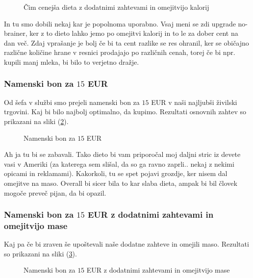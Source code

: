 \documentclass[a4paper]{article}
\begin{document}
\begin{figure}[H]
    \centering
    \caption{Čim cenejša dieta z dodatnimi zahtevami in omejitvijo kalorij}
    \label{fig:eur-add-cal}
\end{figure}

In tu smo dobili nekaj kar je popolnoma uporabno. Vsaj meni se zdi upgrade no-brainer, ker 
z to dieto lahko jemo po omejitvi kalorij in to le za dober cent na dan več. Zdaj vprašanje je bolj 
če bi ta cent razlike se res ohranil, ker se običajno različne količine hrane v resnici
prodajajo po različnih cenah, torej če bi npr. kupili manj mleka, bi bilo to verjetno dražje. 

\subsubsection{Namenski bon za $15$ EUR}
Od šefa v službi smo prejeli namenski bon za $15$ EUR v naši najljubši živilski trgovini. Kaj 
bi bilo najbolj optimalno, da kupimo. Rezultati osnovnih zahtev so prikazani na sliki 
(\ref{fig:eur-budget}).

\begin{figure}[H]
    \centering
    \caption{Namenski bon za $15$ EUR}
    \label{fig:eur-budget}
\end{figure}

Ah ja tu bi se zabavali. Tako dieto bi vam priporočal moj daljni stric iz devete vasi v 
Ameriki (za katerega sem slišal, da so ga ravno zaprli.. nekaj z nekimi opicami in reklamami).
Kakorkoli, tu se spet pojavi grozdje, ker nisem dal omejitve na maso. Overall bi sicer bila to 
kar slaba dieta, ampak bi bil človek mogoče preveč pijan, da bi opazil. \\

\subsubsection{Namenski bon za $15$ EUR z dodatnimi zahtevami in omejitvijo mase}
Kaj pa če bi zraven še upoštevali naše dodatne zahteve in omejili maso. Rezultati so prikazani
na sliki (\ref{fig:eur-budget-add}).

\begin{figure}[H]
    \centering
    \caption{Namenski bon za $15$ EUR z dodatnimi zahtevami in omejitvijo mase}
    \label{fig:eur-budget-add}
\end{figure}
\end{document}
